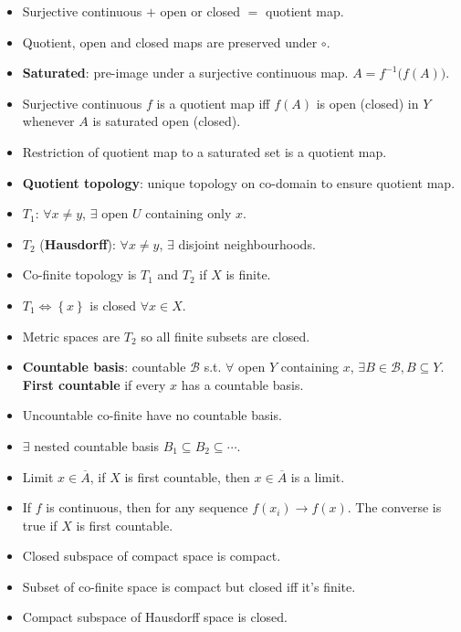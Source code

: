 \documentclass[10pt]{article}
\begin{document}
\begin{multicols*}{3}
\begin{itemize}
            \item Surjective continuous $+$ open or closed $=$ quotient map.
            \item Quotient, open and closed maps are preserved under $\circ$.
            \item \textbf{Saturated}: pre-image under a surjective continuous map. $A = f^{-1}\bigl(f\left(A\right)\bigr)$.
            \item Surjective continuous $f$ is a quotient map iff $f\left(A\right)$ is open (closed) in $Y$ whenever $A$ is saturated open (closed).
            \item Restriction of quotient map to a saturated set is a quotient map.
            \item \textbf{Quotient topology}: unique topology on co-domain to ensure quotient map.
            \item $T_1$: $\forall x \neq y$, $\exists$ open $U$ containing only $x$.
            \item $T_2$ (\textbf{Hausdorff}): $\forall x \neq y$, $\exists$ disjoint neighbourhoods.
            \item Co-finite topology is $T_1$ and $T_2$ if $X$ is finite.
            \item $T_1 \iff \left\{x\right\}$ is closed $\forall x \in X$.
            \item Metric spaces are $T_2$ so all finite subsets are closed.
            \item \textbf{Countable basis}: countable $\mathcal{B}$ s.t. $\forall$ open $Y$ containing $x$, $\exists B \in \mathcal{B}, B \subseteq Y$. \textbf{First countable} if every $x$ has a countable basis.
            \item Uncountable co-finite have no countable basis.
            \item $\exists$ nested countable basis $B_1 \subseteq B_2 \subseteq \cdots$.
            \item Limit $x \in \overline{A}$, if $X$ is first countable, then $x \in \overline{A}$ is a limit.
            \item If $f$ is continuous, then for any sequence $f\left(x_i\right) \to f\left(x\right)$. The converse is true if $X$ is first countable.
            \item Closed subspace of compact space is compact.
            \item Subset of co-finite space is compact but closed iff it's finite.
            \item Compact subspace of Hausdorff space is closed.

\end{itemize}
\end{multicols*}
\end{document}
